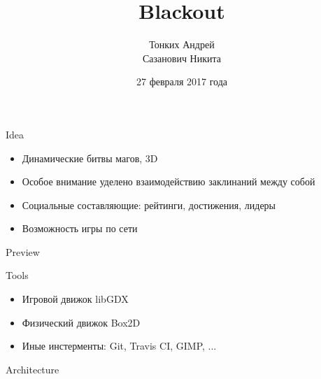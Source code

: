 \documentclass[12pt]{beamer}
\begin{document}
\title{Blackout}

\author[]{
    Тонких Андрей \\
    Сазанович Никита \\
}
\date{27 февраля 2017 года}

\frame{\titlepage}


\begin{frame}{Idea}
    \begin{itemize}
        \item <1-> Динамические битвы магов, 3D
        \item <2-> Особое внимание уделено взаимодействию заклинаний между собой
	\item <3-> Социальные составляющие: рейтинги, достижения, лидеры
        \item <4-> Возможность игры по сети
    \end{itemize}
\end{frame}



\begin{frame} {Preview}
\end{frame}


\begin{frame} {Tools}
    \begin{itemize}
        \item <1-> Игровой движок libGDX
        \item <2-> Физический движок Box2D
        \item <3-> Иные инстерменты: Git, Travis CI, GIMP, ...
    \end{itemize}
\end{frame}


\begin{frame} {Architecture}
\noindent{}
\end{frame}
\end{document}

